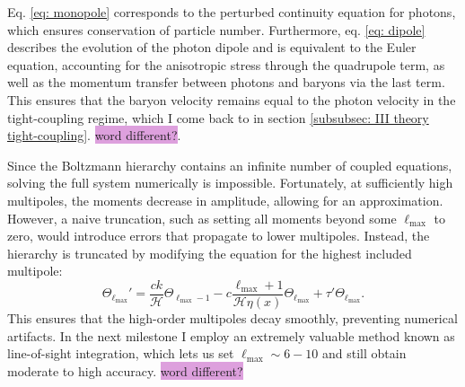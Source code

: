 \documentclass{aa}
\numberwithin{equation}{section}
\numberwithin{table}{section}
\numberwithin{figure}{section}
\begin{document}
Eq. \eqref{eq: monopole} corresponds to the perturbed continuity equation for photons, which ensures conservation of particle number. Furthermore, eq. \eqref{eq: dipole} describes the evolution of the photon dipole and is equivalent to the Euler equation, accounting for the anisotropic stress through the quadrupole term, as well as the momentum transfer between photons and baryons via the last term. 
This ensures that the baryon velocity remains equal to the photon velocity in the tight-coupling regime, which I come back to in section \ref{subsubsec: III theory tight-coupling}. \colorbox{Plum}{word different?}.

Since the Boltzmann hierarchy contains an infinite number of coupled equations, solving the full system numerically is impossible. Fortunately, at sufficiently high multipoles, the moments decrease in amplitude, allowing for an approximation. However, a naive truncation, such as setting all moments beyond some $\ell_{\max}$ to zero, would introduce errors that propagate to lower multipoles. Instead, the hierarchy is truncated by modifying the equation for the highest included multipole:
\begin{equation} 
  \Theta_{\ell_{\max}}' = \frac{ck}{\mathcal{H}} \Theta_{\ell_{\max}-1} - c \frac{\ell_{\max}+1}{\mathcal{H} \eta(x)} \Theta_{\ell_{\max}} + \tau' \Theta_{\ell_{\max}}. 
\end{equation}
This ensures that the high-order multipoles decay smoothly, preventing numerical artifacts. In the next milestone I employ an extremely valuable method known as line-of-sight integration, which lets us set $\ell_{\max} \sim 6-10$ and still obtain moderate to high accuracy. \colorbox{Plum}{word different?}

\end{document}
